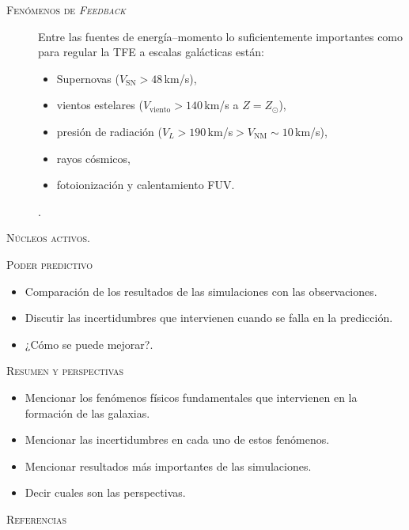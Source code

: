 \documentclass[xcolor=dvipsnames,4pt,hyperref={colorlinks,citecolor=black,linkcolor=black,urlcolor=black}]{beamer}
\begin{document}
\begin{frame}[allowframebreaks]{\textsc{Fenómenos de \emph{Feedback}}}
\begin{description}
Entre las fuentes de energía--momento lo suficientemente importantes como para regular la TFE a
escalas galácticas están:
%
\begin{itemize}
\item Supernovas ($V_\text{SN}>48\,$km/s),
\item vientos estelares ($V_\text{viento}>140\,$km/s a $Z=Z_\odot$),
\item presión de radiación ($V_L>190\,$km/s$>V_\text{NM}\sim10\,$km/s),
\item rayos cósmicos,
\item fotoionización y calentamiento FUV.
\end{itemize}
%
\citep[ver][para una revisión completa]{Krumholz2014}.
%
\item[\textsc{Núcleos activos.}]
%
\end{description}
%
\end{frame}

\begin{frame}[allowframebreaks]{\textsc{Poder predictivo}}
%
\begin{itemize}
\item Comparación de los resultados de las simulaciones con las observaciones.
\item Discutir las incertidumbres que intervienen cuando se falla en la predicción.
\item ¿Cómo se puede mejorar?.
\end{itemize}
%
\end{frame}

\begin{frame}[allowframebreaks]{\textsc{Resumen y perspectivas}}
%
\begin{itemize}
\item Mencionar los fenómenos físicos fundamentales que intervienen en la formación de las galaxias.
\item Mencionar las incertidumbres en cada uno de estos fenómenos.
\item Mencionar resultados más importantes de las simulaciones.
\item Decir cuales son las perspectivas.
\end{itemize}
%
\end{frame}

\begin{frame}[allowframebreaks]{\textsc{Referencias}}
\printbibliography
\end{frame}
\end{document}
